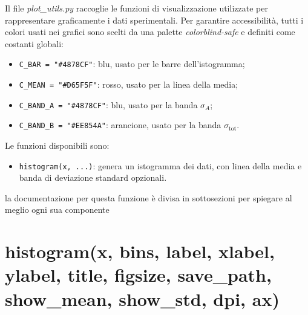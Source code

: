 Il file \textit{plot\_utils.py} raccoglie le funzioni di visualizzazione utilizzate per rappresentare graficamente i dati sperimentali. Per garantire accessibilità, tutti i colori usati nei grafici sono scelti da una palette \textit{colorblind-safe} e definiti come costanti globali:

\begin{itemize}
    \item \texttt{C\_BAR = "\#4878CF"}: blu, usato per le barre dell'istogramma;
    \item \texttt{C\_MEAN = "\#D65F5F"}: rosso, usato per la linea della media;
    \item \texttt{C\_BAND\_A = "\#4878CF"}: blu, usato per la banda $\sigma_A$;
    \item \texttt{C\_BAND\_B = "\#EE854A"}: arancione, usato per la banda $\sigma_\text{tot}$.
\end{itemize}

Le funzioni disponibili sono:
\begin{itemize}
    \item \texttt{histogram(x, ...)}: genera un istogramma dei dati, con linea della media e banda di deviazione standard opzionali.
\end{itemize}
la documentazione per questa funzione è divisa in sottosezioni per spiegare al meglio ogni sua componente
\section{\texorpdfstring{histogram(x, bins, label, xlabel, ylabel, title, figsize, save\_path, show\_mean, show\_std, dpi, ax)}{histogram(x, bins, label, xlabel, ylabel, title, figsize, save\_path, show\_mean, show\_std, dpi, ax)}}
\label{sec:istogramma}

